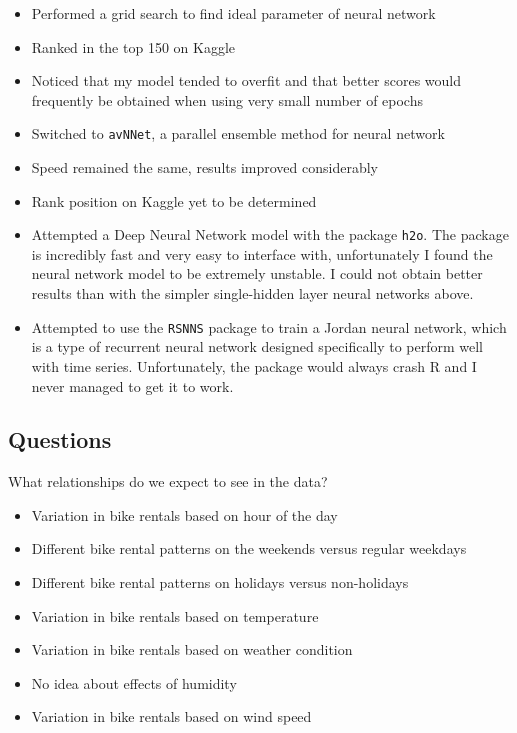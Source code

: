 \documentclass[12pt]{article}
\begin{document}
\begin{enumerate}
\begin{itemize}
\begin{verbatim}
			"weathersit","atempdiff","hum","windspeed")
			\end{itemize}
			\end{verbatim}
			\item Performed a grid search to find ideal parameter of neural network
			\item Ranked in the top 150 on Kaggle
			\item Noticed that my model tended to overfit and that better scores would frequently be obtained when using very small number of epochs
			\item Switched to \texttt{avNNet}, a parallel ensemble method for neural network
			\item Speed remained the same, results improved considerably
			\item Rank position on Kaggle yet to be determined
			\item Attempted a Deep Neural Network model with the package \texttt{h2o}. The package is incredibly fast and very easy to interface with, unfortunately I found the neural network model to be extremely unstable. I could not obtain better results than with the simpler single-hidden layer neural networks above.
			\item Attempted to use the \texttt{RSNNS} package to train a Jordan neural network, which is a type of recurrent neural network designed specifically to perform well with time series. Unfortunately, the package would always crash R and I never managed to get it to work.
		\end{itemize}
	\end{enumerate}
	
	\subsection{Questions}
		What relationships do we expect to see in the data?
		\begin{itemize}
			\item Variation in bike rentals based on hour of the day
			\item Different bike rental patterns on the weekends versus regular weekdays
			\item Different  bike rental patterns on holidays versus non-holidays
			\item Variation in bike rentals based on temperature
			\item Variation in bike rentals based on weather condition
			\item No idea about effects of humidity
			\item Variation in bike rentals based on wind speed
		\end{itemize}
		
\end{document}
